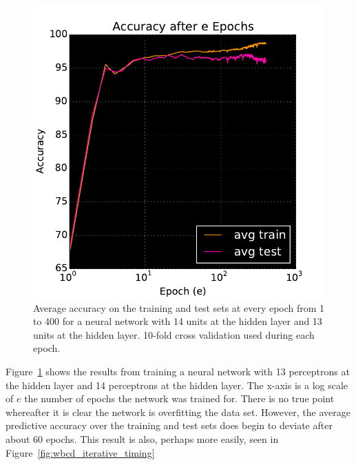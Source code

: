 \begin{figure}[t]
\centering

\includegraphics[width=0.95\columnwidth]{figs/wbcd_iterative}

\caption {Average accuracy on the training and test sets at every epoch from 1 to 400 for a neural network with 14 units at the  hidden layer and 13 units at the  hidden layer. 10-fold cross validation used during each epoch.}
\label{fig:wbcd_iterative}
\end{figure}

Figure~\ref{fig:wbcd_iterative} shows the results from training a neural network with 13 perceptrons at the  hidden layer and 14 perceptrons at the  hidden layer.
The x-axis is a log scale of \(e\) the number of epochs the network was trained for.
There is no true point whereafter it is clear the network is overfitting the data set.
However, the average predictive accuracy over the training and test sets does begin to deviate after about 60 epochs.
This result is also, perhaps more easily, seen in Figure~\ref{fig:wbcd_iterative_timing}

